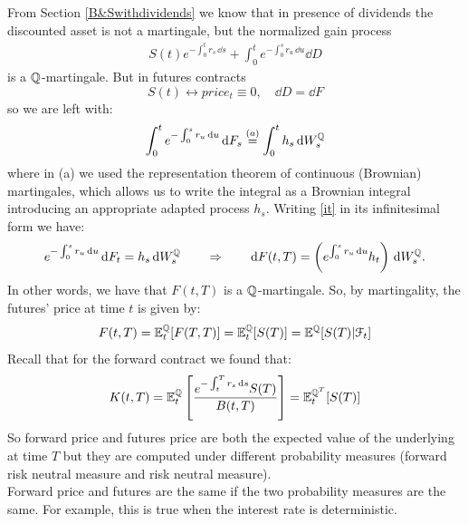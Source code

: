 From Section \ref{B&Swithdividends} we know that in presence of dividends the discounted asset is not a martingale, but the normalized gain process
\begin{align}
    S(t)e^{-\int_0^t r_s\,\dd s} + \int_0^t e^{-\int_0^s r_u\,\dd u}\dd D
\end{align}
is a $\mathbb{Q}$-martingale. But in futures contracts
\begin{equation*}
    S(t) \leftrightarrow price_t \equiv 0, \quad \dd D = \dd F
\end{equation*}
so we are left with:
\begin{align}\label{it}
    \int_0^t e^{-\int_0^s r_u\,\dd u}\,\dd F_s \overset{(a)}{=} \int_0^t h_s\,\dd W_s^{\mathbb{Q}}
\end{align}
where in (a) we used the representation theorem of continuous (Brownian) martingales, which allows us to write the integral as a Brownian integral introducing an appropriate adapted process $h_s$. Writing \eqref{it} in its infinitesimal form we have:
\begin{equation}
    e^{-\int_0^s r_u\,\dd u}\,\dd F_t = h_s\,\dd W_s^{\mathbb{Q}} \qquad\Rightarrow\qquad \dd F(t,T) = \left(e^{\int_0^s r_u\,\dd u}h_t\right)\,\dd W_s^{\mathbb{Q}}.
\end{equation}
In other words, we have that $F(t,T)$ is a $\mathbb{Q}$-martingale. So, by martingality, the futures' price at time $t$ is given by:
\begin{equation}
    F(t,T) = \mathbb{E}^{\mathbb{Q}}_t[F(T,T)] = \mathbb{E}^{\mathbb{Q}}_t[S(T)] = \mathbb{E}^{\mathbb{Q}}[S(T)|\mathcal{F}_t]
\end{equation}
Recall that for the forward contract we found that:
\begin{equation}
    K(t,T) = \mathbb{E}^{\mathbb{Q}}_t\left[\dfrac{e^{-\int_t^T r_s\,\dd s}S(T)}{B(t,T)}\right] = \mathbb{E}^{\mathbb{Q}^T}_t[S(T)]
\end{equation}
So forward price and futures price are both the expected value of the underlying at time $T$ but they are computed under different probability measures (forward risk neutral measure and risk neutral measure). \\
Forward price and futures are the same if the two probability measures are the same. For example, this is true when the interest rate is deterministic.

